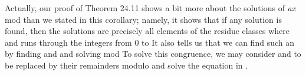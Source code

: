 \documentclass[11pt,oneside]{article}
\begin{document}
\begin{BookBody}
Actually, our proof of Theorem 24.11 shows a bit more about the solutions of \textit{ax} mod  than we stated in this corollary; namely, it shows that if any solution  is found, then the solutions are precisely all elements of the residue classes  where  and  runs through the integers from 0 to  It also tells us that we can find such an  by finding  and  and solving mod  To solve this congruence, we may consider  and  to be replaced by their remainders modulo  and solve the equation  in .

\end{BookBody}

\BookNarrativetrue
\end{document}
